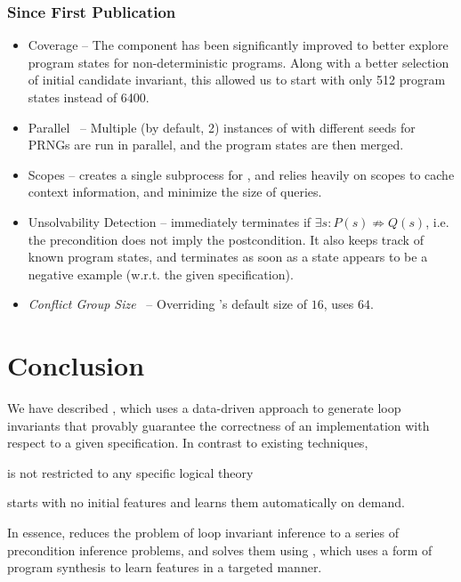 \documentclass[conference]{IEEEtran}
\begin{document}
\subsubsection*{Since First Publication~\cite{Padhi2016DatadrivenPI}}
\begin{itemize}
    \item \Record Coverage --
          The \Record component has been significantly improved to better explore program states for non-deterministic programs.
          Along with a better selection of initial candidate invariant,
          this allowed us to start with only 512 program states instead of 6400.

    \item Parallel \Record\ --
          Multiple (by default, 2) instances of \Record with different seeds for PRNGs are run in parallel,
          and the program states are then merged.

    \item {} Scopes --
          \LoopInvGen creates a single subprocess for , and relies heavily on scopes to cache context information,
          and minimize the size of queries.

    \item Unsolvability Detection --
          \LoopInvGen immediately terminates if $\exists s\colon P(s) \not\Rightarrow Q(s)$,
          i.e. the precondition does not imply the postcondition.
          It also keeps track of known program states, and terminates as soon as a state appears to be a negative example
          (w.r.t. the given specification).

    \item \emph{Conflict Group Size}~\cite{Padhi2016DatadrivenPI} --
          Overriding \PIE's default size of $16$, \LoopInvGen uses $64$.
\end{itemize}




\section{Conclusion} \label{subsec:Conclusion}

\noindent
We have described \LoopInvGen, which uses a data-driven approach to generate loop invariants
that provably guarantee the correctness of an implementation with respect to a given specification.
In contrast to existing techniques, \LoopInvGen
\begin{andlist}
    \item is not restricted to any specific logical theory
    \item starts with no initial features and learns them automatically on demand.
\end{andlist}
In essence, \LoopInvGen reduces the problem of loop invariant inference to a series of precondition inference problems,
and solves them using \PIE, which uses a form of program synthesis to learn features in a targeted manner.
\end{document}
